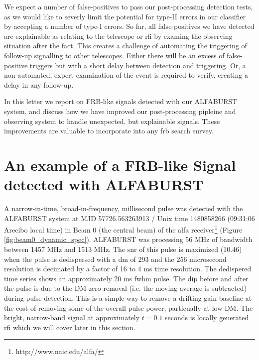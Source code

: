 \documentclass[a4paper,fleqn,usenatbib]{mnras}
\begin{document}
We expect a number of false-positives to pass our post-processing detection
tests, as we would like to severly limit the potential for type-II errors in our
classifier by accepting a number of type-I errors. So far, all false-positives
we have detected are explainable as relating to the telescope or \gls{rfi} by
examing the observing situation after the fact. This creates a challenge of
automating the triggering of follow-up signalling to other telescopes. Either
there will be an excess of false-positive triggers but with a short delay
between detection and triggering. Or, a non-automated, expert examination of the
event is required to verify, creating a delay in any follow-up.

In this letter we report on FRB-like signals detected with our ALFABURST system,
and discuss how we have improved our post-processing pipleine and observing
system to handle unexpected, but explainable signals. These improvements are
valuable to incorporate into any \gls{frb} search survey.

\section{An example of a FRB-like Signal detected with ALFABURST}
\label{sec:D20161204}

A narrow-in-time, broad-in-frequency, millisecond pulse was detected with the
ALFABURST system at MJD 57726.563263913 / Unix time 1480858266 (09:31:06 Arecibo
local time) in Beam 0 (the central beam) of the \gls{alfa}
receiver\footnote{http://www.naic.edu/alfa/} (Figure
\ref{fig:beam0_dynamic_spec}). ALFABURST was processing 56 MHz of bandwidth
between 1457 MHz and 1513 MHz. The \gls{snr} of this pulse is maximized (10.46)
when the pulse is dedispersed with a \gls{dm} of 293 and the 256 microsecond
resolution is decimated by a factor of 16 to 4 ms time resolution. The
dedispered time series shows an approximately 20 ms \gls{fwhm} pulse. The dip
before and after the pulse is due to the DM-zero removal (i.e. the moving
average is subtracted) during pulse detection. This is a simple way to remove a
drifting gain baseline at the cost of removing some of the overall pulse power,
particually at low DM. The bright, narrow-band signal at approximately $t=0.1$
seconds is locally generated \gls{rfi} which we will cover later in this
section.
\end{document}
